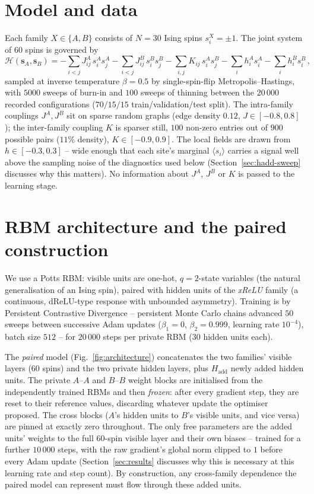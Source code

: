 \documentclass[11pt]{article}
\begin{document}
\section{Model and data}
\label{sec:model}

Each family $X\in\{A,B\}$ consists of $N=30$ Ising spins $s_i^X=\pm1$. The
joint system of $60$ spins is governed by
\begin{equation}
\mathcal{H}(\bm{s}_A,\bm{s}_B) = -\sum_{i<j} J^A_{ij}\,s^A_i s^A_j
-\sum_{i<j} J^B_{ij}\,s^B_i s^B_j
-\sum_{i,j} K_{ij}\,s^A_i s^B_j
-\sum_i h^A_i s^A_i -\sum_i h^B_i s^B_i \, ,
\label{eq:hamiltonian}
\end{equation}
sampled at inverse temperature $\beta=0.5$ by single-spin-flip
Metropolis--Hastings, with $5000$ sweeps of burn-in and $100$ sweeps of
thinning between the $20\,000$ recorded configurations ($70/15/15$
train/validation/test split). The intra-family couplings $J^A,J^B$ sit on
sparse random graphs (edge density $0.12$, $J\in[-0.8,0.8]$); the
inter-family coupling $K$ is sparser still, $100$ non-zero entries out of
$900$ possible pairs ($11\%$ density), $K\in[-0.9,0.9]$. The local fields
are drawn from $h\in[-0.3,0.3]$ -- wide enough that each site's marginal
$\langle s_i\rangle$ carries a signal well above the sampling noise of the
diagnostics used below (Section~\ref{sec:hadd-sweep} discusses why this
matters). No information about $J^A$, $J^B$ or $K$ is passed to the
learning stage.

\section{RBM architecture and the paired construction}
\label{sec:paired}

We use a Potts RBM: visible units are one-hot, $q=2$-state variables (the
natural generalisation of an Ising spin), paired with hidden units of the
\emph{xReLU} family (a continuous, dReLU-type response with unbounded
asymmetry). Training is by Persistent Contrastive Divergence -- persistent
Monte Carlo chains advanced $50$ sweeps between successive Adam updates
($\beta_1=0$, $\beta_2=0.999$, learning rate $10^{-4}$), batch size $512$
-- for $20\,000$ steps per private RBM ($30$ hidden units each).

The \emph{paired} model (Fig.~\ref{fig:architecture}) concatenates the two
families' visible layers ($60$ spins) and the two private hidden layers,
plus $H_{\mathrm{add}}$ newly added hidden units. The private $A$--$A$ and
$B$--$B$ weight blocks are initialised from the independently trained
RBMs and then \emph{frozen}: after every gradient step, they are reset to
their reference values, discarding whatever update the optimiser proposed.
The cross blocks ($A$'s hidden units to $B$'s visible units, and vice
versa) are pinned at exactly zero throughout. The only free parameters are
the added units' weights to the full $60$-spin visible layer and their own
biases -- trained for a further $10\,000$ steps, with the raw gradient's
global norm clipped to $1$ before every Adam update (Section~\ref{sec:results}
discusses why this is necessary at this learning rate and step count). By
construction, any cross-family dependence the paired model can represent
must flow through these added units.
\end{document}

